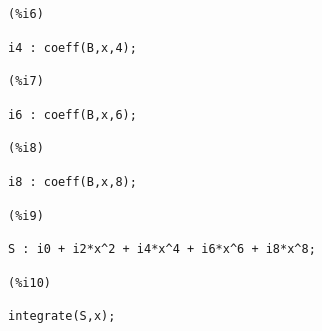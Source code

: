 \documentclass[12pt]{article}
\begin{document}
\noindent
\begin{minipage}[t]{8ex}{\color{red}\bf
\begin{verbatim}
(%i6) 
\end{verbatim}}
\end{minipage}
\begin{minipage}[t]{\textwidth}{\color{blue}
\begin{verbatim}
i4 : coeff(B,x,4);
\end{verbatim}}
\end{minipage}

\noindent
\begin{minipage}[t]{8ex}{\color{red}\bf
\begin{verbatim}
(%i7) 
\end{verbatim}}
\end{minipage}
\begin{minipage}[t]{\textwidth}{\color{blue}
\begin{verbatim}
i6 : coeff(B,x,6);
\end{verbatim}}
\end{minipage}

\noindent
\begin{minipage}[t]{8ex}{\color{red}\bf
\begin{verbatim}
(%i8) 
\end{verbatim}}
\end{minipage}
\begin{minipage}[t]{\textwidth}{\color{blue}
\begin{verbatim}
i8 : coeff(B,x,8);
\end{verbatim}}
\end{minipage}

\noindent
\begin{minipage}[t]{8ex}{\color{red}\bf
\begin{verbatim}
(%i9) 
\end{verbatim}}
\end{minipage}
\begin{minipage}[t]{\textwidth}{\color{blue}
\begin{verbatim}
S : i0 + i2*x^2 + i4*x^4 + i6*x^6 + i8*x^8;
\end{verbatim}}
\end{minipage}

\noindent
\begin{minipage}[t]{8ex}{\color{red}\bf
\begin{verbatim}
(%i10) 
\end{verbatim}}
\end{minipage}
\begin{minipage}[t]{\textwidth}{\color{blue}
\begin{verbatim}
integrate(S,x);
\end{verbatim}}
\end{minipage}
\end{document}
